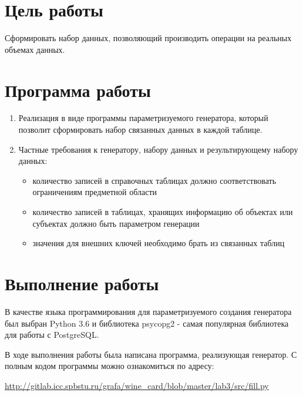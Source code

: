 
\usepackage{minted}
\usepackage{hyperref}




\newpage
\setcounter{page}{2}



\section{Цель работы}
Сформировать набор данных, позволяющий производить операции на реальных объемах данных.

\section{Программа работы}
	\begin {enumerate}
	\item Реализация в виде программы параметризуемого генератора, который позволит сформировать набор связанных данных в каждой таблице.
	\item Частные требования к генератору, набору данных и результирующему набору данных:
	\begin{itemize}
		\item количество записей в справочных таблицах должно соответствовать ограничениям предметной области
		\item количество записей в таблицах, хранящих информацию об объектах или субъектах должно быть параметром генерации
		\item значения для внешних ключей необходимо брать из связанных таблиц
	\end{itemize}
	\end {enumerate}

\section{Выполнение работы}
В качестве языка программирования для параметризуемого создания генератора был выбран Python 3.6 и библиотека psycopg2 - самая популярная библиотека для работы с PostgreSQL.

В ходе выполнения работы была написана программа, реализующая генератор.
С полным кодом программы можно ознакомиться по адресу:

\href{http://gitlab.icc.spbstu.ru/grafa/wine\_card/blob/master/lab3/src/fill.py}{http://gitlab.icc.spbstu.ru/grafa/wine\_card/blob/master/lab3/src/fill.py}

